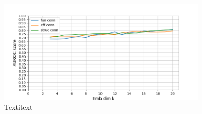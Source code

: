 \documentclass[]{article}
\begin{document}
\begin{figure}
	\centering
	\includegraphics[width=0.9\textwidth]{plotted_figures/dimensionality_trend.png}
	
	\caption{Textitext}
	\label{fig:disc_dim_trend}
\end{figure}
\end{document}
